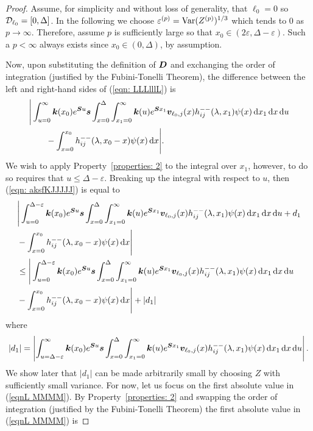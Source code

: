 \begin{proof}
	Assume, for simplicity and without loss of generality, that \(\ell_0=0\) so \(\mathcal{D}_{\ell_0}=[0,\Delta]\). In the following we choose \(\varepsilon^{(p)}=\mathrm{Var}(Z^{(p)})^{1/3}\) which tends to 0 as \(p\to\infty\). Therefore, assume \(p\) is sufficiently large so that \(x_0\in(2\varepsilon,\Delta-\varepsilon)\). Such a \(p<\infty\) always exists since \(x_0\in(0,\Delta)\), by assumption. 
	
	Now, upon substituting the definition of \(\boldsymbol D\) and exchanging the order of integration (justified by the Fubini-Tonelli Theorem), the difference between the left and right-hand sides of (\ref{eqn: LLLlllL}) is 
	\begin{align}
		&\Bigg|\int_{u=0}^\infty \boldsymbol k(x_0)e^{\boldsymbol Su}\boldsymbol s \int_{x=0}^{\Delta}  \int_{x_1=0}^\infty \boldsymbol k(u)  e^{\boldsymbol S x_1} {\boldsymbol v}_{\ell_0,j}(x) h_{ij}^{--}(\lambda, x_1) \psi(x) \, \mathrm{d} x_1 \, \mathrm{d} x \, \mathrm{d} u\nonumber
		\\&{}\qquad {} - \int_{x=0}^{x_0} h_{ij}^{--}(\lambda, x_0 - x)\psi(x)\, \mathrm{d} x\Bigg|.\label{eqn: aksfKJJJJJ}
	\end{align}
	We wish to apply Property~\ref{properties: 2} to the integral over \(x_1\), however, to do so requires that \(u\leq \Delta-\varepsilon\). Breaking up the integral with respect to \(u\), then (\ref{eqn: aksfKJJJJJ}) is equal to 
	\begin{align}
		&\Bigg|\int_{u=0}^{\Delta-\varepsilon} \boldsymbol k(x_0)e^{\boldsymbol Su}\boldsymbol s \int_{x=0}^{\Delta}  \int_{x_1=0}^\infty \boldsymbol k(u)  e^{\boldsymbol S x_1} {\boldsymbol v}_{\ell_0,j}(x) h_{ij}^{--}(\lambda, x_1) \psi(x) \, \mathrm{d} x_1 \, \mathrm{d} x \, \mathrm{d} u + d_1 \nonumber
		\\&{}  - \int_{x=0}^{x_0} h_{ij}^{--}(\lambda, x_0 - x)\psi(x)\, \mathrm{d} x\Bigg|
		\\&\leq \Bigg|\int_{u=0}^{\Delta-\varepsilon} \boldsymbol k(x_0)e^{\boldsymbol Su}\boldsymbol s \int_{x=0}^{\Delta}  \int_{x_1=0}^\infty \boldsymbol k(u)  e^{\boldsymbol S x_1} {\boldsymbol v}_{\ell_0,j}(x) h_{ij}^{--}(\lambda, x_1) \psi(x) \, \mathrm{d} x_1 \, \mathrm{d} x \, \mathrm{d} u\nonumber
		\\&{} - \int_{x=0}^{x_0} h_{ij}^{--}(\lambda, x_0 - x)\psi(x)\, \mathrm{d} x\Bigg| +|d_1| \label{eqnL MMMM}
	\end{align}
	where 
	\[|d_1|=\left|\int_{u=\Delta-\varepsilon}^\infty \boldsymbol k(x_0)e^{\boldsymbol Su}\boldsymbol s \int_{x=0}^{\Delta}  \int_{x_1=0}^\infty \boldsymbol k(u)  e^{\boldsymbol S x_1} {\boldsymbol v}_{\ell_0,j}(x) h_{ij}^{--}(\lambda, x_1) \psi(x) \, \mathrm{d} x_1 \, \mathrm{d} x \, \mathrm{d} u\right|.\]
	We show later that \(|d_1|\) can be made arbitrarily small by choosing \(Z\) with sufficiently small variance.  For now, let us focus on the first absolute value in (\ref{eqnL MMMM}). By Property~\ref{properties: 2} and swapping the order of integration (justified by the Fubini-Tonelli Theorem) the first absolute value in (\ref{eqnL MMMM}) is 

\end{proof}
